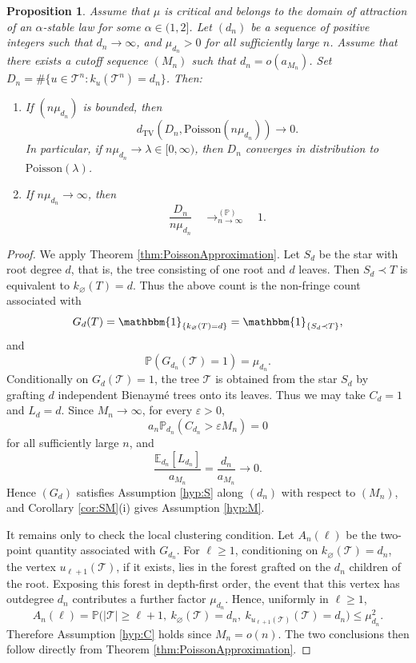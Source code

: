 \documentclass[a4paper,11pt]{article}
\newtheorem{proposition}[theorem]{Proposition}
\newcommand{\E}{\mathbb{E}}
\DeclareRobustCommand{\P}{\mathbb{P}}
\DeclareRobustCommand{\1}{\mathbf{1}}
\newcommand{\dTV}{d_{\mathrm{TV}}}
\newcommand{\Po}{\mathrm{Poisson}}
\begin{document}
\begin{proposition}
\label{prop:largeoutdegree}
Assume that $\mu$ is critical and belongs to the domain of
    attraction of an $\alpha$-stable law for some $\alpha\in(1,2]$. Let $(d_n)$ be a sequence of positive integers such that
$d_n\to\infty$, and $\mu_{d_n}>0$ for all sufficiently large
$n$. Assume that there exists a cutoff sequence $(M_n)$ such that
$d_n=o(a_{M_n})$.
Set $
D_n
=
\#\{u\in\mathcal T^n:k_u(\mathcal T^n)=d_n\}$.
Then:
\begin{enumerate}
\item[(i)] If $(n\mu_{d_n})$ is bounded, then
$$
\dTV\left(D_n,\Po(n\mu_{d_n})\right)
\longrightarrow0.
$$
In particular, if $n\mu_{d_n}\to\lambda\in[0,\infty)$, then
$D_n$ converges in distribution to $\Po(\lambda)$.

\item[(ii)] If $n\mu_{d_n}\to\infty$, then
$$
\frac{D_n}{n\mu_{d_n}}
\quad\mathop{\longrightarrow}^{(\P)}_{n\to\infty}\quad
1.
$$
\end{enumerate}
\end{proposition}
\begin{proof}

We apply Theorem \ref{thm:PoissonApproximation}. Let $S_d$ be the star with root degree $d$, that is, the tree
consisting of one root and $d$ leaves. Then $S_d\prec T$ is equivalent to
$k_\varnothing(T)=d$. Thus the above count is the non-fringe count associated
with
$$
G_d(T)=\mathbbm{1}_{\{k_\varnothing(T)=d\}}
      =\mathbbm{1}_{\{S_d\prec T\}},
$$
and
$$
\P(G_{d_n}(\mathcal T)=1)=\mu_{d_n}.
$$
Conditionally on $G_d(\mathcal T)=1$, the tree $\mathcal T$ is obtained from
the star $S_d$ by grafting $d$ independent Bienaym\'e trees onto its leaves. Thus we may take $C_d=1$ and $L_d=d$. Since $M_n\to\infty$, for every
$\varepsilon>0$,
$$
a_n\P_{d_n}(C_{d_n}>\varepsilon M_n)=0
$$
for all sufficiently large $n$, and
$$
\frac{\E_{d_n}[L_{d_n}]}{a_{M_n}}
=
\frac{d_n}{a_{M_n}}
\longrightarrow0.
$$
Hence $(G_d)$ satisfies Assumption \ref{hyp:S} along $(d_n)$ with respect
to $(M_n)$, and Corollary \ref{cor:SM}\textup{(i)} gives Assumption
\ref{hyp:M}.

It remains only to check the local clustering condition. Let $A_n(\ell)$ be
the two-point quantity associated with $G_{d_n}$. For $\ell\ge1$,
conditioning on $k_\varnothing(\mathcal T)=d_n$, the vertex
$u_{\ell+1}(\mathcal T)$, if it exists, lies in the forest grafted on the
$d_n$ children of the root. Exposing this forest in depth-first order, the
event that this vertex has outdegree $d_n$ contributes a further factor
$\mu_{d_n}$. Hence, uniformly in $\ell\ge1$,
$$
A_n(\ell)
=
\P\bigl(
|\mathcal T|\ge \ell+1,\
k_\varnothing(\mathcal T)=d_n,\
k_{u_{\ell+1}(\mathcal T)}(\mathcal T)=d_n
\bigr)
\le
\mu_{d_n}^2.
$$
Therefore Assumption \ref{hyp:C}  holds since $M_n=o(n)$. The two conclusions then
follow directly from Theorem \ref{thm:PoissonApproximation}.
\end{proof}
\end{document}
